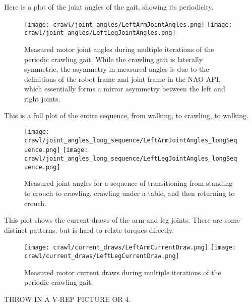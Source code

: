 Here is a plot of the joint angles of the gait, showing its periodicity.

\begin{figure}
  \centerline{
    \texttt{[image: crawl/joint\_angles/LeftArmJointAngles.png]}
    \texttt{[image: crawl/joint\_angles/LeftLegJointAngles.png]}
  }
  \vspace*{-0.05in}
  \caption{Measured motor joint angles during multiple iterations of the periodic crawling gait.
           While the crawling gait is laterally symmetric, the asymmetry in measured angles is due to the
           definitions of the robot frame and joint frame in the NAO API, which essentially forms a mirror
           asymmetry between the left and right joints.}
  \label{fig:nao_joint_angles1}
  \vspace*{-0.1in}
\end{figure}

This is a full plot of the entire sequence, from walking, to crawling, to walking.

\begin{figure}
  \centerline{
    \texttt{[image: crawl/joint\_angles\_long\_sequence/LeftArmJointAngles\_longSequence.png]}
    \texttt{[image: crawl/joint\_angles\_long\_sequence/LeftLegJointAngles\_longSequence.png]}
  }
  \vspace*{-0.05in}
  \caption{Measured joint angles for a sequence of transitioning from standing to crouch to crawling,
           crawling under a table, and then returning to crouch.}
  \label{fig:nao_joint_angles_long_seq}
  \vspace*{-0.2in}
\end{figure}

This plot shows the current draws of the arm and leg joints.
There are some distinct patterns, but is hard to relate torques directly.

\begin{figure}
  \centerline{
    \texttt{[image: crawl/current\_draws/LeftArmCurrentDraw.png]}
    \texttt{[image: crawl/current\_draws/LeftLegCurrentDraw.png]}
  }
  \vspace*{-0.03in}
  \caption{Measured motor current draws during multiple iterations of the periodic crawling gait.}
  \label{fig:nao_currents}
  \vspace*{-0.23in}
\end{figure}


THROW IN A V-REP PICTURE OR 4.


